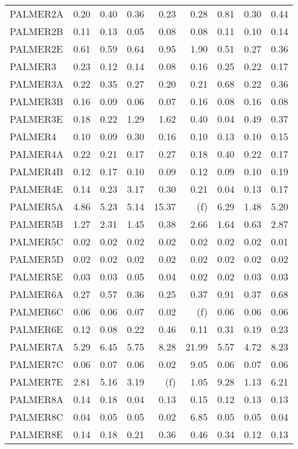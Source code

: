 \documentclass[11pt,twoside]{article}
\begin{document}
{\begin{longtable}[c]{|l|r|r|r|r|r|r|r|r|}
PALMER2A & 0.20 & 0.40 & 0.36 & 0.23 & 0.28 & 0.81 & 0.30 & 0.44 \\
PALMER2B & 0.11 & 0.13 & 0.05 & 0.08 & 0.08 & 0.11 & 0.10 & 0.14 \\
PALMER2E & 0.61 & 0.59 & 0.64 & 0.95 & 1.90 & 0.51 & 0.27 & 0.36 \\
PALMER3 & 0.23 & 0.12 & 0.14 & 0.08 & 0.16 & 0.25 & 0.22 & 0.17 \\
PALMER3A & 0.22 & 0.35 & 0.27 & 0.20 & 0.21 & 0.68 & 0.22 & 0.36 \\
PALMER3B & 0.16 & 0.09 & 0.06 & 0.07 & 0.16 & 0.08 & 0.16 & 0.08 \\
PALMER3E & 0.18 & 0.22 & 1.29 & 1.62 & 0.40 & 0.04 & 0.49 & 0.37 \\
PALMER4 & 0.10 & 0.09 & 0.30 & 0.16 & 0.10 & 0.13 & 0.10 & 0.15 \\
PALMER4A & 0.22 & 0.21 & 0.17 & 0.27 & 0.18 & 0.40 & 0.22 & 0.17 \\
PALMER4B & 0.12 & 0.17 & 0.10 & 0.09 & 0.12 & 0.09 & 0.10 & 0.19 \\
PALMER4E & 0.14 & 0.23 & 3.17 & 0.30 & 0.21 & 0.04 & 0.13 & 0.17 \\
PALMER5A & 4.86 & 5.23 & 5.14 & 15.37 & (f) & 6.29 & 1.48 & 5.20 \\
PALMER5B & 1.27 & 2.31 & 1.45 & 0.38 & 2.66 & 1.64 & 0.63 & 2.87 \\
PALMER5C & 0.02 & 0.02 & 0.02 & 0.02 & 0.02 & 0.02 & 0.02 & 0.01 \\
PALMER5D & 0.02 & 0.02 & 0.02 & 0.02 & 0.02 & 0.02 & 0.02 & 0.02 \\
PALMER5E & 0.03 & 0.03 & 0.05 & 0.04 & 0.02 & 0.02 & 0.03 & 0.03 \\
PALMER6A & 0.27 & 0.57 & 0.36 & 0.25 & 0.37 & 0.91 & 0.37 & 0.68 \\
PALMER6C & 0.06 & 0.06 & 0.07 & 0.02 & (f) & 0.06 & 0.06 & 0.06 \\
PALMER6E & 0.12 & 0.08 & 0.22 & 0.46 & 0.11 & 0.31 & 0.19 & 0.23 \\
PALMER7A & 5.29 & 6.45 & 5.75 & 8.28 & 21.99 & 5.57 & 4.72 & 8.23 \\
PALMER7C & 0.06 & 0.07 & 0.06 & 0.02 & 9.05 & 0.06 & 0.07 & 0.06 \\
PALMER7E & 2.81 & 5.16 & 3.19 & (f) & 1.05 & 9.28 & 1.13 & 6.21 \\
PALMER8A & 0.14 & 0.18 & 0.04 & 0.13 & 0.15 & 0.12 & 0.13 & 0.13 \\
PALMER8C & 0.04 & 0.05 & 0.05 & 0.02 & 6.85 & 0.05 & 0.05 & 0.04 \\
PALMER8E & 0.14 & 0.18 & 0.21 & 0.36 & 0.46 & 0.34 & 0.12 & 0.13 \\

\end{longtable}}
\end{document}
